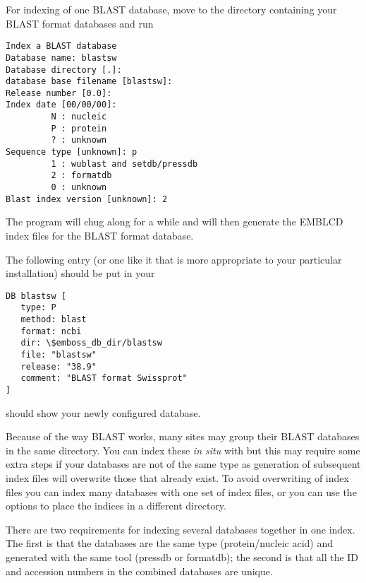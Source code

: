 \documentclass{report}
\begin{document}
\begin{comment}At present \EMBOSS\
will only index BLAST databases created from FASTA format input files
with one of the recognised header formats.  More information on the
relevant formats can be found in subsection \ref{subsec:fasta}
below.
\end{comment}

For indexing of one BLAST database, move to the
directory containing your BLAST format databases and run

\begin{verbatim}
Index a BLAST database
Database name: blastsw
Database directory [.]: 
database base filename [blastsw]: 
Release number [0.0]: 
Index date [00/00/00]: 
         N : nucleic
         P : protein
         ? : unknown
Sequence type [unknown]: p
         1 : wublast and setdb/pressdb
         2 : formatdb
         0 : unknown
Blast index version [unknown]: 2

\end{verbatim}

The program will chug along for a while and will then generate the
EMBLCD index files for the BLAST format database.

The following entry (or one like it that is more appropriate to your
particular installation) should be put in your \filename{.embossrc}

\begin{verbatim}
DB blastsw [
   type: P
   method: blast
   format: ncbi
   dir: \$emboss_db_dir/blastsw
   file: "blastsw"
   release: "38.9"
   comment: "BLAST format Swissprot"
]
\end{verbatim}

 should show your newly configured database.

Because of the way BLAST works, many sites may group their BLAST
databases in the same directory. You can index these {\it in situ}
with \progname{dbiblast} but this may require some extra steps if your
databases are not of the same type as generation of subsequent index
files will overwrite those that already exist. To avoid overwriting of
index files you can index many databases with one set of index files,
or you can use the \ilcomm{indexdir} options to place the indices in a
different directory.

There are two requirements for indexing several databases together in
one index. The first is that the databases are the same type
(protein/nucleic acid) and generated with the same tool (pressdb or
formatdb); the second is that all the ID and accession numbers in the
combined databases are unique.
\end{document}
